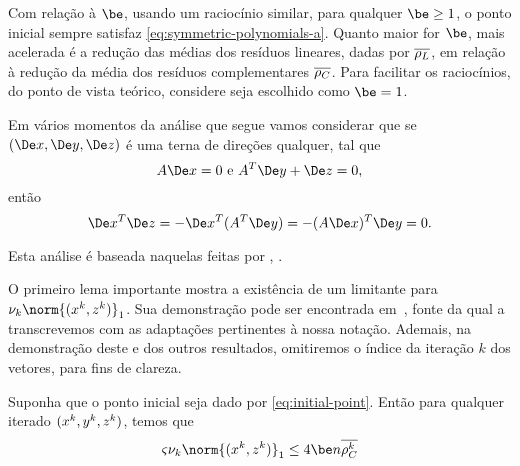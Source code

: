 Com relação à $\be$,  usando um raciocínio similar, para qualquer  $\be\geq 1$, o ponto inicial sempre satisfaz \eqref{eq:symmetric-polynomials-a}. Quanto maior for $\be$, mais acelerada é a redução  das médias dos resíduos lineares, dadas por $\overline{\rho_L}$, em relação à redução da média dos resíduos complementares $\overline{\rho_C}$. Para facilitar os raciocínios, do ponto de vista teórico, considere seja escolhido como $\be=1$.


\begin{obs}
	Em vários momentos da análise que segue vamos considerar que se $(\Dex,\Dey,\Dez)$ é uma terna de direções qualquer,  tal que 
\begin{equation}
	\label{eq:Ax0-ATyz0}
	A\Dex=0 \text{ e } A^T\Dey + \Dez = 0,
\end{equation}
então
\begin{equation}
	\label{eq:xTziszero}
	\Dex^T\Dez =  - \Dex^T(A^T\Dey)  = -(A\Dex)^T\Dey = 0.
\end{equation}
\end{obs}



Esta análise é  baseada naquelas feitas por \textcite[cap. 6]{Wright:Primal-dual-interior-point:1997h},  \textcite{Zhang:2006ic,Zhang:1995fu}. 

O primeiro lema importante mostra a existência de um limitante para $\nu_k\norm{(\xk,\zk)}_{1}$. Sua demonstração pode ser encontrada em~\cite[Lema 6.1]{Wright:Primal-dual-interior-point:1997h}, fonte da qual a transcrevemos com as adaptações pertinentes à nossa notação. Ademais, na demonstração deste e dos outros resultados, omitiremos o índice da iteração $k$ dos vetores, para fins de clareza. 




\begin{lema}\label{lemma:boundxz1}
	Suponha que o ponto inicial seja dado por \eqref{eq:initial-point}. Então para qualquer iterado $(x^k,y^k,z^k)$,  temos que 
	\begin{equation}
		\label{eq:bound-xkzk}
		\bdxzstar\nu_k\norm{(\xk,\zk)}_{1} \leq  4\be n \dbvec{\rho_C^{k}}
	\end{equation}
\end{lema}

